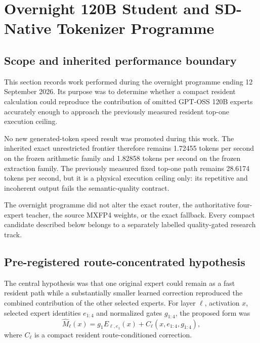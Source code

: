 
\section{Overnight 120B Student and SD-Native Tokenizer Programme}
\label{sec:gptoss120b-overnight-route-student-20260912}

\subsection{Scope and inherited performance boundary}

This section records work performed during the overnight programme ending
12 September 2026.  Its purpose was to determine whether a compact resident
calculation could reproduce the contribution of omitted GPT-OSS 120B experts
accurately enough to approach the previously measured resident top-one
execution ceiling.

No new generated-token speed result was promoted during this work.  The
inherited exact unrestricted frontier therefore remains 1.72455 tokens per
second on the frozen arithmetic family and 1.82858 tokens per second on the
frozen extraction family.  The previously measured fixed top-one path remains
28.6174 tokens per second, but it is a physical execution ceiling only: its
repetitive and incoherent output fails the semantic-quality contract.

The overnight programme did not alter the exact router, the authoritative
four-expert teacher, the source MXFP4 weights, or the exact fallback.  Every
compact candidate described below belongs to a separately labelled
quality-gated research track.

\subsection{Pre-registered route-concentrated hypothesis}

The central hypothesis was that one original expert could remain as a fast
resident path while a substantially smaller learned correction reproduced the
combined contribution of the other selected experts.  For layer $\ell$,
activation $x$, selected expert identities $e_{1:4}$ and normalized gates
$g_{1:4}$, the proposed form was
\begin{equation}
 \widehat{M}_{\ell}(x)
 = g_1E_{\ell,e_1}(x)
 + C_{\ell}\!\left(x,e_{1:4},g_{1:4}\right),
\end{equation}
where $C_{\ell}$ is a compact resident route-conditioned correction.

